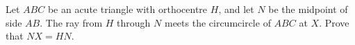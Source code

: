 Let $ABC$ be an acute triangle with orthocentre $H$, and let $N$ be the midpoint of side $AB$. The ray from $H$ through $N$ meets the circumcircle of $ABC$ at $X$. Prove that $NX=HN$.
